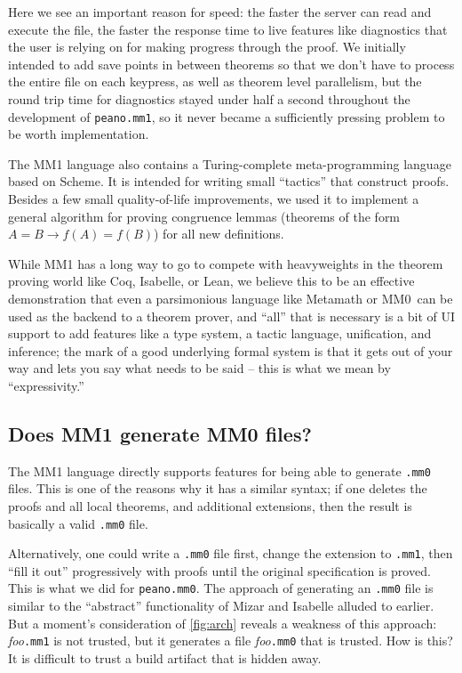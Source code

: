 \documentclass[runningheads]{llncs}
\newcommand{\mmO}{\textsf{MM0}}
\begin{document}
Here we see an important reason for speed: the faster the server can read and execute the file, the faster the response time to live features like diagnostics that the user is relying on for making progress through the proof. We initially intended to add save points in between theorems so that we don't have to process the entire file on each keypress, as well as  theorem level parallelism, but the round trip time for diagnostics stayed under half a second throughout the development of \texttt{peano.mm1}, so it never became a sufficiently pressing problem to be worth implementation.

The \textsf{MM1} language also contains a Turing-complete meta-programming language based on Scheme. It is intended for writing small ``tactics'' that construct proofs. Besides a few small quality-of-life improvements, we used it to implement a general algorithm for proving congruence lemmas (theorems of the form $A = B\to f(A)=f(B)$) for all new definitions.

While \textsf{MM1} has a long way to go to compete with heavyweights in the theorem proving world like Coq, Isabelle, or Lean, we believe this to be an effective demonstration that even a parsimonious language like Metamath or \mmO\ can be used as the backend to a theorem prover, and ``all'' that is necessary is a bit of UI support to add features like a type system, a tactic language, unification, and inference; the mark of a good underlying formal system is that it gets out of your way and lets you say what needs to be said -- this is what we mean by ``expressivity.''

\subsection{Does MM1 generate MM0 files?}
The \textsf{MM1} language directly supports features for being able to generate \texttt{.mm0} files. This is one of the reasons why it has a similar syntax; if one deletes the proofs and all \textsf{local theorem}s, and additional extensions, then the result is basically a valid \texttt{.mm0} file.

Alternatively, one could write a \texttt{.mm0} file first, change the extension to \texttt{.mm1}, then ``fill it out'' progressively with proofs until the original specification is proved. This is what we did for \texttt{peano.mm0}. The approach of generating an \texttt{.mm0} file is similar to the ``abstract'' functionality of Mizar and Isabelle alluded to earlier. But a moment's consideration of \autoref{fig:arch} reveals a weakness of this approach: \emph{foo}\texttt{.mm1} is not trusted, but it generates a file \emph{foo}\texttt{.mm0} that is trusted. How is this? It is difficult to trust a build artifact that is hidden away.
\end{document}
